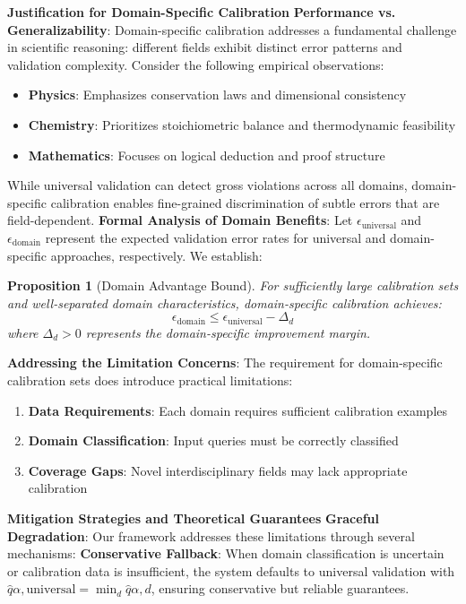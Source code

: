 \documentclass{uai2026} %
\theoremstyle{remark}
\theoremstyle{plain}
\newtheorem{proposition}[theorem]{Proposition}
\theoremstyle{definition}
\begin{document}
\textbf{Justification for Domain-Specific Calibration}
\textbf{Performance vs. Generalizability}: Domain-specific calibration addresses a fundamental challenge in scientific reasoning: different fields exhibit distinct error patterns and validation complexity. Consider the following empirical observations:
\begin{itemize}
\item \textbf{Physics}: Emphasizes conservation laws and dimensional consistency
\item \textbf{Chemistry}: Prioritizes stoichiometric balance and thermodynamic feasibility
\item \textbf{Mathematics}: Focuses on logical deduction and proof structure
\end{itemize}
While universal validation can detect gross violations across all domains, domain-specific calibration enables fine-grained discrimination of subtle errors that are field-dependent.
\textbf{Formal Analysis of Domain Benefits}: Let $\epsilon_{\text{universal}}$ and $\epsilon_{\text{domain}}$ represent the expected validation error rates for universal and domain-specific approaches, respectively. We establish:
\begin{proposition}[Domain Advantage Bound]
\label{prop:domain-advantage}
For sufficiently large calibration sets and well-separated domain characteristics, domain-specific calibration achieves:
\[
\epsilon_{\text{domain}} \leq \epsilon_{\text{universal}} - \Delta_d
\]
where $\Delta_d > 0$ represents the domain-specific improvement margin.

\end{proposition}
\textbf{Addressing the Limitation Concerns}: The requirement for domain-specific calibration sets does introduce practical limitations:
\begin{enumerate}
\item \textbf{Data Requirements}: Each domain requires sufficient calibration examples
\item \textbf{Domain Classification}: Input queries must be correctly classified
\item \textbf{Coverage Gaps}: Novel interdisciplinary fields may lack appropriate calibration
\end{enumerate}
\textbf{Mitigation Strategies and Theoretical Guarantees}
\textbf{Graceful Degradation}: Our framework addresses these limitations through several mechanisms:
\textbf{Conservative Fallback}: When domain classification is uncertain or calibration data is insufficient, the system defaults to universal validation with $\hat{q}{\alpha,\text{universal}} = \min_d \hat{q}{\alpha,d}$, ensuring conservative but reliable guarantees.
\end{document}
